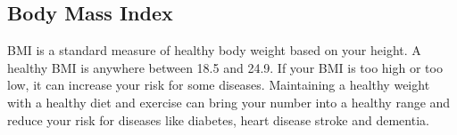 \subsection{Body Mass Index}

BMI is a standard measure of healthy body weight based on your height. A healthy
BMI is anywhere between 18.5 and 24.9. If your BMI is too high or too low, it
can increase your risk for some diseases. Maintaining a healthy weight with a
healthy diet and exercise can bring your number into a healthy range and reduce
your risk for diseases like diabetes, heart disease stroke and dementia.